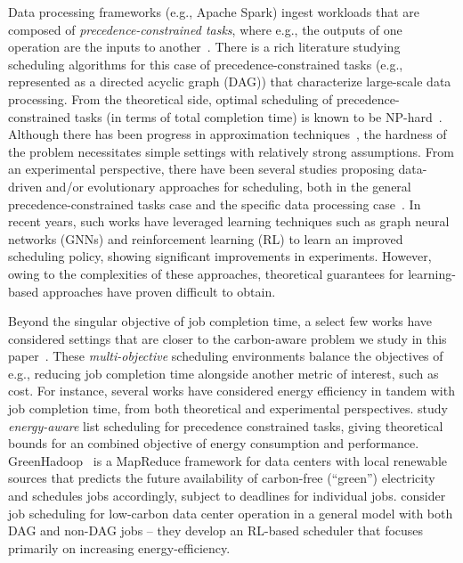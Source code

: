 Data processing frameworks (e.g., Apache Spark) ingest workloads that are composed of \textit{precedence-constrained tasks}, where e.g., the outputs of one operation are the inputs to another~\cite{Zaharia:12}.  
There is a rich literature studying scheduling algorithms for this case of precedence-constrained tasks (e.g., represented as a directed acyclic graph (DAG)) that characterize large-scale data processing.  From the theoretical side, optimal scheduling of precedence-constrained tasks (in terms of total completion time) is known to be NP-hard~\cite{Lenstra:78}.  Although there has been progress in approximation techniques~\cite{Su:24:Tompecs, Chudak:99, Lassota:23, Li:17, Davies:20, Davies:21, Maiti:20, Su:23}, the hardness of the problem necessitates simple settings with relatively strong assumptions. From an experimental perspective, there have been several studies proposing data-driven and/or evolutionary approaches for scheduling, both in the general precedence-constrained tasks case and the specific data processing case~\cite{Hongzi:2019:Decima, Wu:18, Li:23, Grinsztajn:20, Zhou:22, Cheng:96:Genetic, Pezzella:08:Genetic, Davis:14:Genetic, Islam:21}.  In recent years, such works have leveraged learning techniques such as graph neural networks (GNNs) and reinforcement learning (RL) to learn an improved scheduling policy, showing significant improvements in experiments.  However, owing to the complexities of these approaches, theoretical guarantees for learning-based approaches have proven difficult to obtain.




Beyond the singular objective of job completion time, a select few works have considered settings that are closer to the carbon-aware problem we study in this paper~\cite{Su:24:Tompecs, Goiri:2012:GreenHadoop, Liu:23}.  These \textit{multi-objective} scheduling environments balance the objectives of e.g., reducing job completion time alongside another metric of interest, such as cost.  For instance, several works have considered energy efficiency in tandem with job completion time, from both theoretical and experimental perspectives.  \citet{Su:24:Tompecs} study \textit{energy-aware} list scheduling for precedence constrained tasks, %
giving theoretical bounds for an combined objective of energy consumption and performance.
GreenHadoop~\cite{Goiri:2012:GreenHadoop} is a MapReduce framework for data centers with local renewable sources that predicts the future availability of carbon-free (``green'') electricity and schedules jobs accordingly, subject to deadlines for individual jobs.  
\citet{Liu:23} consider job scheduling for low-carbon data center operation in a general model with both DAG and non-DAG jobs -- they develop an RL-based scheduler that focuses primarily on increasing energy-efficiency.

